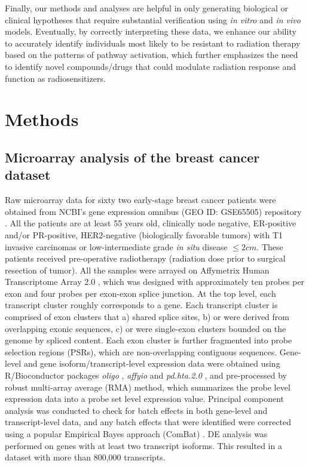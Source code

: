 \documentclass[hidelinks,11pt]{article}
\begin{document}
Finally, our methods and analyses are helpful in only generating biological or clinical hypotheses that require substantial verification using \emph{in vitro} and \emph{in vivo} models. Eventually, by correctly interpreting these data, we enhance our ability to accurately identify individuals most likely to be resistant to radiation therapy based on the patterns of pathway activation, which further emphasizes the need to identify novel compounds/drugs that could modulate radiation response and function as radiosensitizers.

\section*{Methods}

\subsection*{Microarray analysis of the breast cancer dataset}

Raw microarray data for sixty two early-stage breast cancer patients were obtained from NCBI's gene expression omnibus (GEO ID: GSE65505) repository \cite{GEO}. All the patients are at least 55 years old, clinically node negative, ER-positive and/or PR-positive, HER2-negative (biologically favorable tumors) with T1 invasive carcinomas or low-intermediate grade \emph{in situ} disease $\leq 2cm$. These patients received pre-operative radiotherapy (radiation dose prior to surgical resection of tumor). All the samples were arrayed on Affymetrix Human Transcriptome Array 2.0 \cite{affymetrix}, which was designed with approximately ten probes per exon and four probes per exon-exon splice junction. At the top level, each transcript cluster roughly corresponds to a gene. Each transcript cluster is comprised of exon clusters that  a) shared splice sites, b) or were derived from overlapping exonic sequences, c) or were single-exon clusters bounded on the genome by spliced content. Each exon cluster is further fragmented into probe selection regions (PSRs), which are non-overlapping contiguous sequences. Gene-level and gene isoform/transcript-level expression data were obtained using R/Bioconductor packages \emph{oligo} \cite{oligo}, \emph{affyio} \cite{affyio} and \emph{pd.hta.2.0} \cite{pdhta}, and pre-processed by robust multi-array average (RMA) method, which summarizes the probe level expression data into a probe set level expression value. Principal component analysis was conducted to check for batch effects in both gene-level and transcript-level data, and any batch effects that were identified were corrected using a popular Empirical Bayes approach (ComBat) \cite{combat}. DE analysis was performed on genes with at least two transcript isoforms. This resulted in a dataset with more than 800,000 transcripts. 
\end{document}
